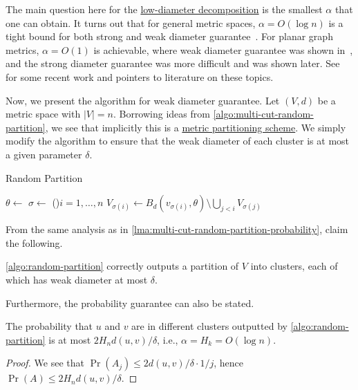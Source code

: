 The main question here for the \hyperref[def:low-diameter-decomposition]{low-diameter decomposition} is the smallest \(\alpha \) that one can obtain. It turns out that for general metric spaces, \(\alpha = O(\log n)\) is a tight bound for both strong and weak diameter guarantee~\cite{bartal1996probabilistic}. For planar graph metrics, \(\alpha = O(1)\) is achievable, where weak diameter guarantee was shown in~\cite{klein1993excluded}, and the strong diameter guarantee was more difficult and was shown later. See~\cite{filtser2024sparse} for some recent work and pointers to literature on these topics.

Now, we present the algorithm for weak diameter guarantee. Let \((V, d)\) be a metric space with \(\lvert V \rvert = n\). Borrowing ideas from \autoref{algo:multi-cut-random-partition}, we see that implicitly this is a \hyperref[def:low-diameter-decomposition-scheme]{metric partitioning scheme}. We simply modify the algorithm to ensure that the weak diameter of each cluster is at most a given parameter \(\delta \).

\begin{algorithm}[H]\label{algo:random-partition}
	\DontPrintSemicolon{}
	\caption{Random Partition~\cite{calinescu2005approximation}}

	\BlankLine

	\(\theta \gets\)\uniform{\([0, \delta / 2)\)}\;
	\(\sigma \gets\)
	\For(){\(i = 1, \dots , n\)}{
		\(V_{\sigma (i)} \gets B_d(v_{\sigma (i)}, \theta ) \setminus \bigcup_{j < i} V_{\sigma (j)}\)\;
	}
	\;
\end{algorithm}

From the same analysis as in \autoref{lma:multi-cut-random-partition-probability}, claim the following.

\begin{claim}
	\autoref{algo:random-partition} correctly outputs a partition of \(V\) into clusters, each of which has weak diameter at most \(\delta \).
\end{claim}

Furthermore, the probability guarantee can also be stated.

\begin{theorem}\label{thm:random-partition}
	The probability that \(u\) and \(v\) are in different clusters outputted by \autoref{algo:random-partition} is at most  \(2 H_n d(u, v) / \delta \), i.e., \(\alpha = H_k = O(\log n)\).
\end{theorem}
\begin{proof}
	We see that \(\Pr(A_j) \leq 2d(u, v) / \delta \cdot 1 / j\), hence \(\Pr(A) \leq 2 H_n d(u, v) / \delta \).
\end{proof}

